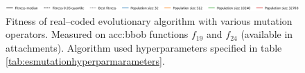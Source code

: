 \begin{figure}[ht!]
    \begin{minipage}{\textwidth}
        \centering
        \includegraphics[width=\textwidth]{img/runs/fitness_es_mutation_legend.pdf}
    \end{minipage}

    \caption[Fitness of various mutation operators in real--coded evolutionary algorithms]{Fitness of real--coded evolutionary algorithm with various mutation operators. Measured on \acrshort{acc:bbob} functions $f_{19}$ and $f_{24}$ (available in attachments). Algorithm used hyperparameters specified in table \ref{tab:esmutationhyperparmarameters}.}
\end{figure}



